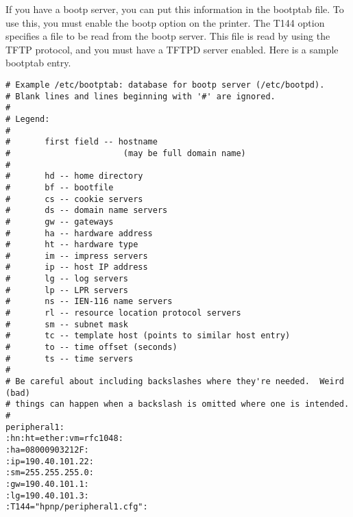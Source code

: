 \documentclass[a4paper]{article}
\begin{document}
If  you have a bootp server, you can put this information
in  the  bootptab  file.   To  use this, you must enable the
bootp  option  on  the printer.  The T144 option specifies a
file to be read from the bootp server.  This file is read by
using  the  TFTP  protocol, and you must have a TFTPD server
enabled.  Here is a sample bootptab entry.
\begin{tscreen}
\begin{verbatim}
# Example /etc/bootptab: database for bootp server (/etc/bootpd).
# Blank lines and lines beginning with '#' are ignored.
#
# Legend:
#
#       first field -- hostname
#                       (may be full domain name)
#
#       hd -- home directory
#       bf -- bootfile
#       cs -- cookie servers
#       ds -- domain name servers
#       gw -- gateways
#       ha -- hardware address
#       ht -- hardware type
#       im -- impress servers
#       ip -- host IP address
#       lg -- log servers
#       lp -- LPR servers
#       ns -- IEN-116 name servers
#       rl -- resource location protocol servers
#       sm -- subnet mask
#       tc -- template host (points to similar host entry)
#       to -- time offset (seconds)
#       ts -- time servers
#
# Be careful about including backslashes where they're needed.  Weird (bad)
# things can happen when a backslash is omitted where one is intended.
#
peripheral1:
:hn:ht=ether:vm=rfc1048:
:ha=08000903212F:
:ip=190.40.101.22:
:sm=255.255.255.0:
:gw=190.40.101.1:
:lg=190.40.101.3:
:T144="hpnp/peripheral1.cfg":
\end{verbatim}
\end{tscreen}
\end{document}
